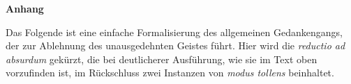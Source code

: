 \documentclass[a4paper, 12pt]{article}
\begin{document}
\begin{onehalfspace}









\newpage

\end{onehalfspace}
\nocite{*}
\printbibliography

\newpage
\noindent\textbf{Anhang}
\vspace{6pt}

\noindent Das Folgende ist eine einfache Formalisierung des allgemeinen Gedankengangs, der zur Ablehnung des unausgedehnten Geistes führt. Hier wird die \emph{reductio ad absurdum} gekürzt, die bei deutlicherer Ausführung, wie sie im Text oben vorzufinden ist, im Rückschluss zwei Instanzen von \emph{modus tollens} beinhaltet. 
\end{document}
